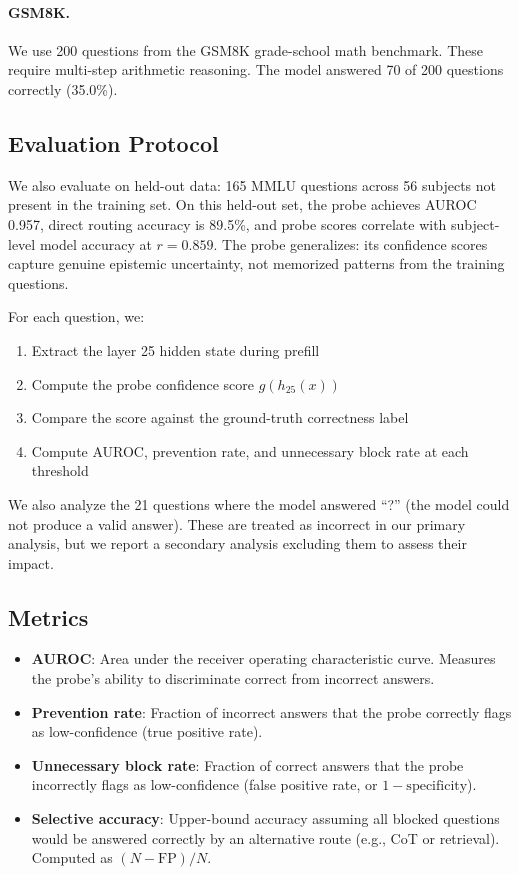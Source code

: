 \documentclass{article}
\begin{document}
\paragraph{GSM8K.}
We use 200 questions from the GSM8K grade-school math benchmark. These require multi-step arithmetic reasoning. The model answered 70 of 200 questions correctly (35.0\%).

\subsection{Evaluation Protocol}

We also evaluate on held-out data: 165 MMLU questions across 56 subjects not present in the training set. On this held-out set, the probe achieves AUROC 0.957, direct routing accuracy is 89.5\%, and probe scores correlate with subject-level model accuracy at $r=0.859$. The probe generalizes: its confidence scores capture genuine epistemic uncertainty, not memorized patterns from the training questions.

For each question, we:
\begin{enumerate}
    \item Extract the layer 25 hidden state during prefill
    \item Compute the probe confidence score $g(h_{25}(x))$
    \item Compare the score against the ground-truth correctness label
    \item Compute AUROC, prevention rate, and unnecessary block rate at each threshold
\end{enumerate}

We also analyze the 21 questions where the model answered ``?'' (the model could not produce a valid answer). These are treated as incorrect in our primary analysis, but we report a secondary analysis excluding them to assess their impact.

\subsection{Metrics}

\begin{itemize}
    \item \textbf{AUROC}: Area under the receiver operating characteristic curve. Measures the probe's ability to discriminate correct from incorrect answers.
    \item \textbf{Prevention rate}: Fraction of incorrect answers that the probe correctly flags as low-confidence (true positive rate).
    \item \textbf{Unnecessary block rate}: Fraction of correct answers that the probe incorrectly flags as low-confidence (false positive rate, or $1 - \text{specificity}$).
    \item \textbf{Selective accuracy}: Upper-bound accuracy assuming all blocked questions would be answered correctly by an alternative route (e.g., CoT or retrieval). Computed as $(N - \text{FP}) / N$.
\end{itemize}
\end{document}
